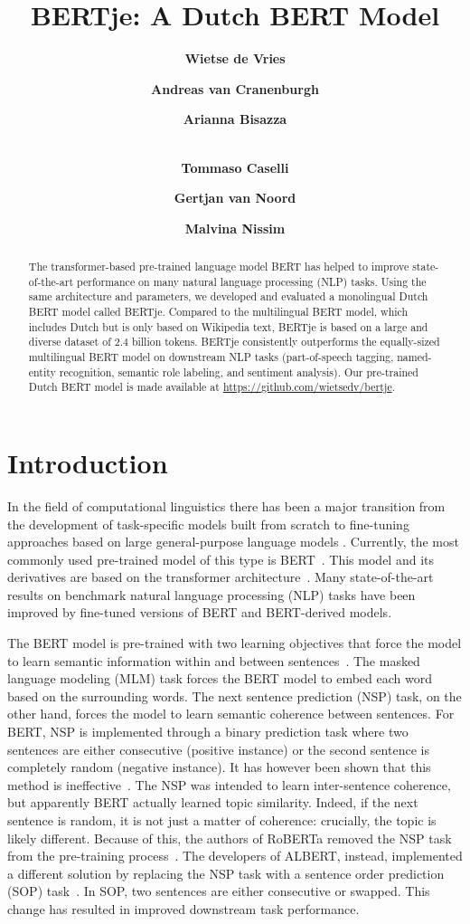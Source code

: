 \documentclass[11pt]{article}
\title{BERTje: A Dutch BERT Model \vspace*{.5cm}}
\author[]{\textbf{Wietse de Vries}}
\author[]{\textbf{Andreas van Cranenburgh}}
\author[]{\textbf{Arianna Bisazza}\vspace*{-.2cm}}
\author[]{\\ \textbf{Tommaso Caselli}}
\author[]{\textbf{Gertjan van Noord}}
\author[]{\textbf{Malvina Nissim}}
\affil{CLCG, University of Groningen, The Netherlands
    \vspace{5px} \\
    \texttt{research@wietsedv.nl}\\
    \texttt{\{a.w.van.cranenburgh,a.bisazza,} \\
    \texttt{t.caselli,g.j.m.van.noord,m.nissim\}@rug.nl} 
}
\date{}
\begin{document}
\maketitle

\vspace*{.7cm}
\begin{abstract}
  The transformer-based pre-trained language model BERT has helped to improve state-of-the-art performance on many natural language processing (NLP) tasks.
  Using the same architecture and parameters, we developed and evaluated a monolingual Dutch BERT model called BERTje.
  Compared to the multilingual BERT model, which includes Dutch but is only based on Wikipedia text, BERTje is based on a large and diverse dataset of 2.4 billion tokens.
  BERTje consistently outperforms the equally-sized multilingual BERT model on downstream NLP tasks (part-of-speech tagging, named-entity recognition, semantic role labeling, and sentiment analysis).
  Our pre-trained Dutch BERT model is made available at \url{https://github.com/wietsedv/bertje}.
\end{abstract}

\section{Introduction}
In the field of computational linguistics there has been a major transition from the development of task-specific models built from scratch
to fine-tuning approaches based on large general-purpose language models \citep{Howard:2018,Peters:2018}.
Currently, the most commonly used pre-trained model of this type is BERT~\citep{devlin2019bert}.
This model and its derivatives are based on the transformer architecture~\citep{vaswani2017attention}.
Many state-of-the-art results on benchmark natural language processing (NLP) tasks have been improved by fine-tuned versions of BERT and BERT-derived models.

The BERT model is pre-trained with two learning objectives that force the model to learn semantic information within and between sentences~\citep{devlin2019bert}.
The masked language modeling (MLM) task forces the BERT model to embed each word based on the surrounding words.
The next sentence prediction (NSP) task, on the other hand, forces the model to learn semantic coherence between sentences.
For BERT, NSP is implemented through a binary prediction task where two sentences are either consecutive (positive instance) or the second sentence is completely random (negative instance).
It has however been shown that this method is ineffective~\citep{liu2019roberta}.
The NSP was intended to learn inter-sentence coherence, but apparently BERT actually learned topic similarity.
Indeed, if the next sentence is random, it is not just a matter of coherence: crucially, the topic is likely different.
Because of this, the authors of RoBERTa removed the NSP task from the pre-training process~\citep{liu2019roberta}.
The developers of ALBERT, instead, implemented a different solution by replacing the NSP task with a sentence order prediction (SOP) task~\citep{lan2019albert}.
In SOP, two sentences are either consecutive or swapped. This change has resulted in improved downstream task performance.
\end{document}
